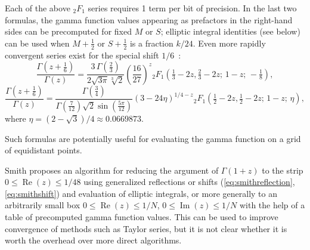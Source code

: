 \documentclass[reqno]{amsart}
\theoremstyle{definition}
\begin{document}
Each of the above ${}_2F_1$ series requires 1 term per bit of precision.
In the last two formulas, the gamma function values appearing as prefactors in the right-hand sides can
be precomputed for fixed $M$ or $S$; elliptic integral
identities (see below) can be used when $M+\tfrac{1}{2}$ or $S+\tfrac{1}{2}$
is a fraction $k/24$.
Even more rapidly convergent series exist for the special shift $1/6$~\cite{smith2006gamma,ekhad2004forty}:
\begin{equation}
\frac{\Gamma(z+\tfrac{1}{6})}{\Gamma(z)} = \frac{3 \, \Gamma(\tfrac{2}{3})}{2 \sqrt{3 \pi} \sqrt[3]{2}} \left(\frac{16}{27}\right)^{z}
{}_2F_1(\tfrac{1}{3} - 2z, \tfrac{2}{3} - 2z;\, 1-z;\, -\tfrac{1}{8}),
\end{equation}
\begin{equation}
\frac{\Gamma(z+\tfrac{1}{6})}{\Gamma(z)} = \frac{\Gamma(\tfrac{3}{4})}{\Gamma(\tfrac{7}{12}) \sqrt{2} \sin(\tfrac{5 \pi}{12})} (3-24 \eta)^{1/4-z} 
{}_2F_1(\tfrac{1}{2} - 2z, \tfrac{1}{2} - 2z;\, 1-z;\, \eta),
\end{equation}
where $\eta = (2 - \sqrt{3})/4 \approx 0.0669873$.

Such formulas are potentially useful for evaluating the gamma
function on a grid of equidistant points.

Smith proposes an algorithm
for reducing the argument of $\Gamma(1+z)$
to the strip $0 \le \operatorname{Re}(z) \le 1/48$
using generalized reflections or shifts (\ref{eq:smithreflection}, \ref{eq:smithshift})
and evaluation of elliptic integrals,
or more generally to an arbitrarily small box
$0 \le \operatorname{Re}(z) \le 1/N$,
$0 \le \operatorname{Im}(z) \le 1/N$
with the help of a table of precomputed gamma function values.
This can be used to improve convergence of methods such as Taylor series,
but it is not clear whether it is worth the overhead over more direct algorithms.
\end{document}
